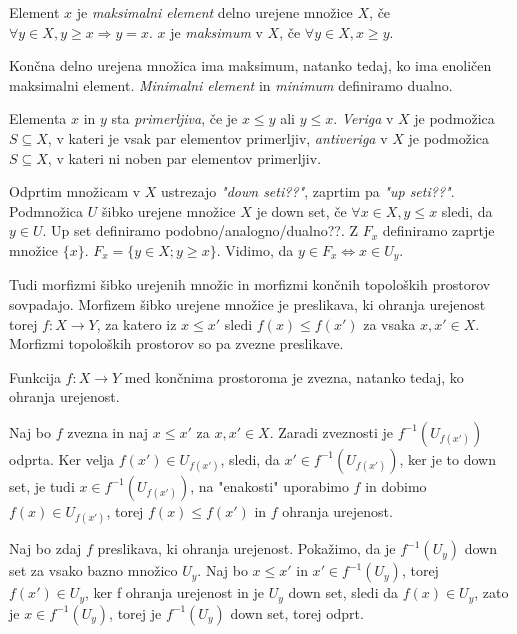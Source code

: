 \begin{definicija}
    Element $x$ je \textit{maksimalni element} delno urejene množice $X$, če $\forall y \in X, y\geq x \Rightarrow y = x$.
    $x$ je \textit{maksimum} v $X$, če $\forall y \in X, x\geq y$.
\end{definicija}

Končna delno urejena množica ima maksimum, natanko tedaj, ko ima enoličen maksimalni element. \textit{Minimalni element} in \textit{minimum} definiramo dualno.

Elementa $x$ in $y$ sta \textit{primerljiva}, če je $x\leq y$ ali $y\leq x$. \textit{Veriga} v $X$ je podmožica $S\subseteq X$, v kateri je vsak par elementov primerljiv, \textit{antiveriga} v $X$ je podmožica $S\subseteq X$, v kateri ni noben par elementov primerljiv. 

Odprtim množicam v $X$ ustrezajo \textit{"down seti??"}, zaprtim pa \textit{"up seti??"}. Podmnožica $U$ šibko urejene množice $X$ je down set, če $\forall x\in X, y\leq x$ sledi, da $y\in U$. Up set definiramo podobno/analogno/dualno??.
Z $F_x$ definiramo zaprtje množice $\{x\}$. $F_x=\{y\in X; y\geq x\}$. Vidimo, da $y\in F_x \Leftrightarrow x\in U_y$.

Tudi morfizmi šibko urejenih množic in morfizmi končnih topoloških prostorov sovpadajo.  Morfizem šibko urejene množice je preslikava, ki ohranja urejenost torej $f: X\rightarrow Y$, za katero iz $x\leq x'$ sledi $f(x)\leq f(x')$ za vsaka $x,x'\in X$. Morfizmi topoloških prostorov so pa zvezne preslikave.

\begin{izrek}
Funkcija $f:X\rightarrow Y$ med končnima prostoroma je zvezna, natanko tedaj, ko ohranja urejenost.
\end{izrek}

\begin{dokaz}
    Naj bo $f$ zvezna in naj $x\leq x'$ za $x, x' \in X$. Zaradi zveznosti je $f^{-1}(U_{f(x')})$ odprta. Ker velja $f(x')\in U_{f(x')}$, sledi, da $x'\in f^{-1}(U_{f(x')})$, ker je to down set, je tudi $x\in f^{-1}(U_{f(x')})$, na "enakosti" uporabimo $f$ in dobimo $f(x)\in U_{f(x')}$, torej $f(x)\leq f(x')$ in $f$ ohranja urejenost.

    Naj bo zdaj $f$ preslikava, ki ohranja urejenost. Pokažimo, da je $f^{-1}(U_y)$ down set za vsako bazno množico $U_y$. Naj bo $x\leq x'$ in $x'\in f^{-1}(U_y)$, torej $f(x') \in U_y$, ker f ohranja urejenost in je $U_y$ down set, sledi da $f(x)\in U_y$, zato je $x\in f^{-1}(U_y)$, torej je $f^{-1}(U_y)$ down set, torej odprt.


\end{dokaz}


